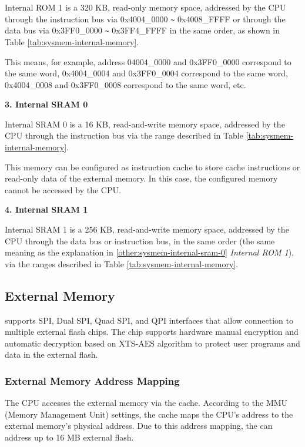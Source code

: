 \documentclass[main\_\_EN.tex]{subfiles}
\begin{document}
Internal ROM 1 is a 320 KB, read-only memory space, addressed by the CPU through the instruction bus via 0x4004\_0000 \verb+~+ 0x4008\_FFFF or through the data bus via 0x3FF0\_0000 \verb+~+ 0x3FF4\_FFFF in the same order, as shown in Table \ref{tab:sysmem-internal-memory}.

This means, for example, address 04004\_0000 and 0x3FF0\_0000 correspond to the same word, 0x4004\_0004 and 0x3FF0\_0004 correspond to the same word, 0x4004\_0008 and 0x3FF0\_0008 correspond to the same word, etc.



{\bfseries 3. Internal SRAM 0}
\label{other:sysmem-internal-sram-0}

Internal SRAM 0 is a 16 KB, read-and-write memory space, addressed by the CPU through the instruction bus via the range described in Table \ref{tab:sysmem-internal-memory}.

This memory can be configured as instruction cache to store cache instructions or read-only data of the external memory. In this case, the configured memory cannot be accessed by the CPU.


{\bfseries 4. Internal SRAM 1}

Internal SRAM 1 is a 256 KB, read-and-write memory space, addressed by the CPU through the data bus or instruction bus, in the same order (the same meaning as the explanation in \ref{other:sysmem-internal-sram-0} \textit{Internal ROM 1}), via the ranges described in Table \ref{tab:sysmem-internal-memory}.


\subsection{External Memory}
\label{para:sysmem-external-memory}

\chipname{} supports SPI, Dual SPI, Quad SPI, and QPI interfaces that allow connection to multiple external flash chips. The chip supports hardware manual encryption and automatic decryption based on XTS-AES algorithm to protect user programs and data in the external flash.


\subsubsection{External Memory Address Mapping}

The CPU accesses the external memory via the cache. According to the MMU (Memory Management Unit) settings, the cache maps the CPU's address to the external memory's physical address. Due to this address mapping, the \chipname{} can address up to 16 MB external flash.
\end{document}
